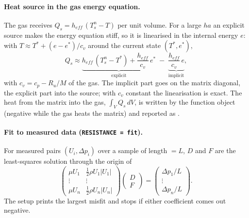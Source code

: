 \paragraph{Heat source in the gas energy equation.}
The gas receives $Q_s = h_{eff}\,(T_s^{n} - T)$ per unit volume. For a large $h a$ an explicit source makes the energy equation stiff, so it is linearised in the internal energy $e$: with $T \approx T^* + (e - e^*)/c_v$ around the current state $(T^*, e^*)$,
\begin{equation}
Q_s \approx \underbrace{h_{eff}\,(T_s^{n} - T^*) + \frac{h_{eff}}{c_v}\, e^*}_{\textrm{explicit}} \;-\; \underbrace{\frac{h_{eff}}{c_v}\, e}_{\textrm{implicit}} ,
\end{equation}
with $c_v = c_p - R_u/M$ of the gas. The implicit part goes on the matrix diagonal, the explicit part into the source; with $c_v$ constant the linearisation is exact. The heat from the matrix into the gas, $\int_V Q_s\,dV$, is written by the  function object (negative while the gas heats the matrix) and reported as .

\paragraph{Fit to measured data (\texttt{RESISTANCE = fit}).}
For measured pairs $(U_i, \Delta p_i)$ over a sample of length  $= L$, $D$ and $F$ are the least-squares solution through the origin of
\begin{equation}
\left(\begin{array}{cc} \mu U_1 & \frac{1}{2}\rho U_1|U_1| \\ \vdots & \vdots \\ \mu U_n & \frac{1}{2}\rho U_n|U_n| \end{array}\right)
\left(\begin{array}{c} D \\ F \end{array}\right) =
\left(\begin{array}{c} \Delta p_1/L \\ \vdots \\ \Delta p_n/L \end{array}\right) .
\end{equation}
The setup prints the largest misfit and stops if either coefficient comes out negative.

